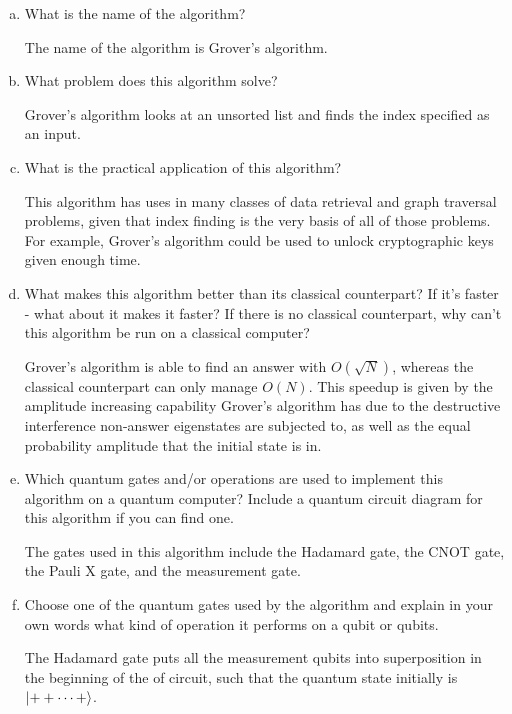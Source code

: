 \documentclass[10pt,letterpaper]{article}
\begin{document}
\begin{enumerate}
\begin{enumerate}[a)]

\item What is the name of the algorithm?

\color{violet}
The name of the algorithm is Grover's algorithm.
\color{black}

\item What problem does this algorithm solve?

\color{violet}
Grover's algorithm looks at an unsorted list and finds the index specified as an input. 
\color{black}

\item What is the practical application of this algorithm?

\color{violet}
This algorithm has uses in many classes of data retrieval and graph traversal problems, given that index finding is the very basis of all of those problems. For example, Grover's algorithm could be used to unlock cryptographic keys given enough time. 
\color{black}

\item What makes this algorithm better than its classical counterpart? If it's faster - what about it makes it faster? If there is no classical counterpart, why can't this algorithm be run on a classical computer?

\color{violet}
Grover's algorithm is able to find an answer with $O(\sqrt{N})$, whereas the classical counterpart can only manage $O(N)$. This speedup is given by the amplitude increasing capability Grover's algorithm has due to the destructive interference non-answer eigenstates are subjected to, as well as the equal probability amplitude that the initial state is in. 
\color{black}

\item Which quantum gates and/or operations are used to implement this algorithm on a quantum computer? Include a quantum circuit diagram for this algorithm if you can find one.

\color{violet}
The gates used in this algorithm include the Hadamard gate, the CNOT gate, the Pauli X gate, and the measurement gate.
\color{black}

\item Choose one of the quantum gates used by the algorithm and explain in your own words what kind of operation it performs on a qubit or qubits. 

\color{violet}
The Hadamard gate puts all the measurement qubits into superposition in the beginning of the of circuit, such that the quantum state initially is $\ket{++\dots+}$. 
\color{black}

\end{enumerate}

\end{enumerate}
\end{document}
